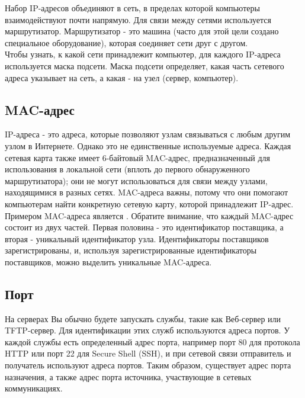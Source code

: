 \documentclass[14pt, a4paper]{article}
\begin{document}
Набор IP-адресов объединяют в сеть, в пределах которой компьютеры взаимодействуют почти
напрямую. Для связи между сетями используется маршрутизатор. Маршрутизатор - это машина (часто
для этой цели создано специальное оборудование), которая соединяет сети друг с другом.\\

Чтобы узнать, к какой сети принадлежит компьютер, для каждого IP-адреса используется маска
подсети. Маска подсети определяет, какая часть сетевого адреса указывает на сеть, а какая - на узел
(сервер, компьютер).

\subsection*{MAC-адрес} 

IP-адреса - это адреса, которые позволяют узлам связываться с любым другим узлом в Интернете.
Однако это не единственные используемые адреса. Каждая сетевая карта также имеет 6-байтовый
MAC-адрес, предназначенный для использования в локальной сети (вплоть до первого
обнаруженного маршрутизатора); они не могут использоваться для связи между узлами,
находящимися в разных сетях. MAC-адреса важны, потому что они помогают компьютерам найти
конкретную сетевую карту, которой принадлежит IP-адрес.\\

Примером MAC-адреса является . Обратите внимание, что каждый MAC-адрес
состоит из двух частей. Первая половина - это идентификатор поставщика, а вторая - уникальный
идентификатор узла. Идентификаторы поставщиков зарегистрированы, и, используя
зарегистрированные идентификаторы поставщиков, можно выделить уникальные MAC-адреса.

\subsection*{Порт} 

На серверах Вы обычно будете запускать службы, такие как Веб-сервер или TFTP-сервер. Для
идентификации этих служб используются адреса портов. У каждой службы есть определенный адрес
порта, например порт 80 для протокола HTTP или порт 22 для Secure Shell (SSH), и при сетевой связи
отправитель и получатель используют адреса портов. Таким образом, существует адрес порта
назначения, а также адрес порта источника, участвующие в сетевых коммуникациях.
\end{document}
